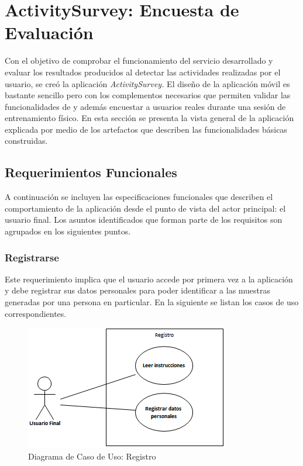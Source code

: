 \section{ActivitySurvey: Encuesta de Evaluación}

\label{sec55:activity}Con el objetivo de comprobar el funcionamiento
del servicio \emph{} desarrollado y evaluar los resultados
producidos al detectar las actividades realizadas por el usuario,
se creó la aplicación \emph{ActivitySurvey. }El diseño de la aplicación
móvil es bastante sencillo pero con los complementos necesarios que
permiten validar las funcionalidades de \emph{} y
además encuestar a usuarios reales durante una sesión de entrenamiento
físico. En esta sección se presenta la vista general de la aplicación
explicada por medio de los artefactos que describen las funcionalidades
básicas construidas. 

\subsection{Requerimientos Funcionales}

A continuación se incluyen las especificaciones funcionales que describen
el comportamiento de la aplicación desde el punto de vista del actor
principal: el usuario final. Los asuntos identificados que forman
parte de los requisitos son agrupados en los siguientes puntos.

\subsubsection{Registrarse}

Este requerimiento implica que el usuario accede por primera vez a
la aplicación y debe registrar sus datos personales para poder identificar
a las muestras generadas por una persona en particular. En la siguiente
 se listan los casos de uso correspondientes.

\begin{figure}[H]
\begin{centering}
\includegraphics{capitulo-5/graphics/caso_registro}
\par\end{centering}
\caption[Diagrama de Caso de Uso: Registro]{\label{fig5:uc-registro}Diagrama de Caso de Uso: Registro}
\end{figure}

